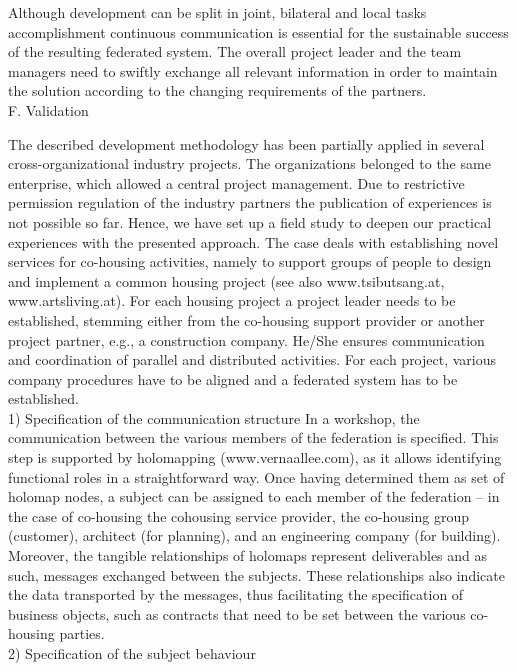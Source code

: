 Although development can be split in joint, bilateral and local tasks accomplishment continuous communication is essential for the sustainable success of the resulting federated system.
The overall project leader and the team managers need to swiftly exchange all relevant information in order to maintain the solution according to the changing requirements of the partners.
\\
F.	Validation

The described development methodology has been partially applied in several cross-organizational industry projects. The organizations belonged to the same enterprise, which allowed a central project management. Due to restrictive permission regulation of the industry partners the publication of experiences is not possible so far. Hence, we have set up a field study to deepen our practical experiences with the presented approach. 
The case deals with establishing novel services for co-housing activities, namely to support groups of people to design and implement a common housing project (see also www.tsibutsang.at, www.artsliving.at). For each housing project a project leader needs to be established, stemming either from the co-housing support provider or another project partner, e.g., a construction company. He/She ensures communication and coordination of parallel and distributed activities. For each project, various company procedures have to be aligned and a federated system has to be established. 
\\
1)	Specification of the communication structure
In a workshop, the communication between the various members of the federation is specified. This step is supported by holomapping (www.vernaallee.com), as it allows identifying functional roles in a straightforward way.  Once having determined them as set of holomap nodes, a subject can be assigned to each member of the federation – in the case of co-housing the cohousing service provider, the co-housing group (customer), architect (for planning), and an engineering company (for building). Moreover, the tangible relationships of holomaps represent deliverables and as such, messages exchanged between the subjects. These relationships also indicate the data transported by the messages, thus facilitating the specification of business objects, such as contracts that need to be set between the various co-housing parties.
\\
2)	Specification of the subject behaviour  
